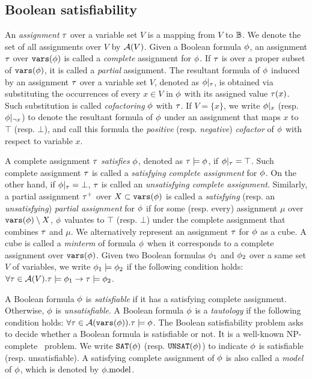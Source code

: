 \subsection{Boolean satisfiability}
An \textit{assignment} $\tau$ over a variable set $V$ is a mapping from $V$ to $\mathbb{B}$.
We denote the set of all assignments over $V$ by $\mathcal{A}(V)$.
Given a Boolean formula $\phi$,
an assignment $\tau$ over $\texttt{vars}(\phi)$ is called a \textit{complete} assignment for $\phi$.
If $\tau$ is over a proper subset of $\texttt{vars}(\phi)$, it is called a \textit{partial} assignment.
The resultant formula of $\phi$ induced by an assignment $\tau$ over a variable set $V$,
denoted as $\phi|_{\tau}$,
is obtained via substituting the occurrences of every $x\in V$ in $\phi$ with its assigned value $\tau(x)$.
Such substitution is called \textit{cofactoring} $\phi$ with $\tau$.
If $V=\{x\}$, we write $\phi|_{x}$ (resp. $\phi|_{\lnot x}$) to denote the resultant formula of $\phi$ under an assignment that maps $x$ to $\top$ (resp. $\bot$),
and call this formula the \textit{positive} (resp. \textit{negative}) \textit{cofactor} of $\phi$ with respect to variable $x$.

A complete assignment $\tau$ \textit{satisfies} $\phi$, denoted as $\tau\models\phi$, if $\phi|_{\tau}=\top$.
Such complete assignment $\tau$ is called a \textit{satisfying complete assignment} for $\phi$.
On the other hand, if $\phi|_{\tau}=\bot$, $\tau$ is called an \textit{unsatisfying complete assignment}.
Similarly, a partial assignment $\tau^+$ over $X\subset\texttt{vars}(\phi)$ is called a \textit{satisfying} (resp. an \textit{unsatisfying}) \textit{partial assignment} for $\phi$
if for some (resp. every) assignment $\mu$ over $\texttt{vars}(\phi)\setminus X$,
$\phi$ valuates to $\top$ (resp. $\bot$) under the complete assignment that combines $\tau$ and $\mu$.
We alternatively represent an assignment $\tau$ for $\phi$ as a cube.
A cube is called a \textit{minterm} of formula $\phi$ when it corresponds to a complete assignment over $\texttt{vars}(\phi)$.
Given two Boolean formulas $\phi_1$ and $\phi_2$ over a same set $V$ of variables,
we write $\phi_1\models\phi_2$ if the following condition holds:
$\forall\tau\in\mathcal{A}(V).\tau\models\phi_1\rightarrow\tau\models\phi_2$.

A Boolean formula $\phi$ is \textit{satisfiable} if it has a satisfying complete assignment.
Otherwise, $\phi$ is \textit{unsatisfiable}.
A Boolean formula $\phi$ is a \textit{tautology} if the following condition holds:
$\forall\tau\in\mathcal{A}(\texttt{vars}(\phi)).\tau\models\phi$.
The Boolean satisfiability problem asks to decide whether a Boolean formula is satisfiable or not.
It is a well-known NP-complete~\cite{Cook1971} problem.
We write $\texttt{SAT}(\phi)$ (resp. $\texttt{UNSAT}(\phi)$) to indicate $\phi$ is satisfiable (resp. unsatisfiable).
A satisfying complete assignment of $\phi$ is also called a \textit{model} of $\phi$, which is denoted by $\phi.\mathrm{model}$.

